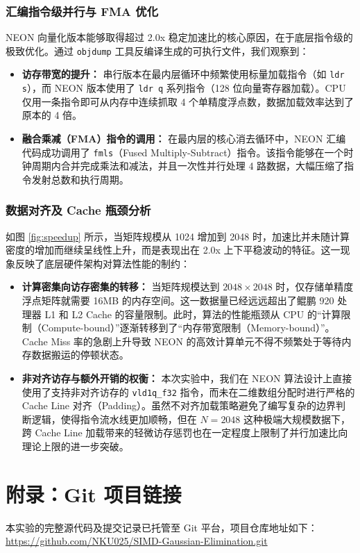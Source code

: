 \documentclass[a4paper]{article}
\begin{document}
\subsubsection{汇编指令级并行与 FMA 优化}
NEON 向量化版本能够取得超过 2.0x 稳定加速比的核心原因，在于底层指令级的极致优化。通过 \texttt{objdump} 工具反编译生成的可执行文件，我们观察到：
\begin{itemize}
    \item \textbf{访存带宽的提升：} 串行版本在最内层循环中频繁使用标量加载指令（如 \texttt{ldr s}），而 NEON 版本使用了 \texttt{ldr q} 系列指令（128 位向量寄存器加载）。CPU 仅用一条指令即可从内存中连续抓取 4 个单精度浮点数，数据加载效率达到了原本的 4 倍。
    \item \textbf{融合乘减（FMA）指令的调用：} 在最内层的核心消去循环中，NEON 汇编代码成功调用了 \texttt{fmls}（Fused Multiply-Subtract）指令。该指令能够在一个时钟周期内合并完成乘法和减法，并且一次性并行处理 4 路数据，大幅压缩了指令发射总数和执行周期。
\end{itemize}

\subsubsection{数据对齐及 Cache 瓶颈分析}
如图 \ref{fig:speedup} 所示，当矩阵规模从 1024 增加到 2048 时，加速比并未随计算密度的增加而继续呈线性上升，而是表现出在 2.0x 上下平稳波动的特征。这一现象反映了底层硬件架构对算法性能的制约：
\begin{itemize}
    \item \textbf{计算密集向访存密集的转移：} 当矩阵规模达到 $2048 \times 2048$ 时，仅存储单精度浮点矩阵就需要 16MB 的内存空间。这一数据量已经远远超出了鲲鹏 920 处理器 L1 和 L2 Cache 的容量限制。此时，算法的性能瓶颈从 CPU 的“计算限制（Compute-bound）”逐渐转移到了“内存带宽限制（Memory-bound）”。Cache Miss 率的急剧上升导致 NEON 的高效计算单元不得不频繁处于等待内存数据搬运的停顿状态。
    \item \textbf{非对齐访存与额外开销的权衡：} 本次实验中，我们在 NEON 算法设计上直接使用了支持非对齐访存的 \texttt{vld1q\_f32} 指令，而未在二维数组分配时进行严格的 Cache Line 对齐（Padding）。虽然不对齐加载策略避免了编写复杂的边界判断逻辑，使得指令流水线更加顺畅，但在 $N=2048$ 这种极端大规模数据下，跨 Cache Line 加载带来的轻微访存惩罚也在一定程度上限制了并行加速比向理论上限的进一步突破。
\end{itemize}

\newpage
\section*{附录：Git 项目链接}
本实验的完整源代码及提交记录已托管至 Git 平台，项目仓库地址如下：\\
\url{https://github.com/NKU025/SIMD-Gaussian-Elimination.git} %
\end{document}
